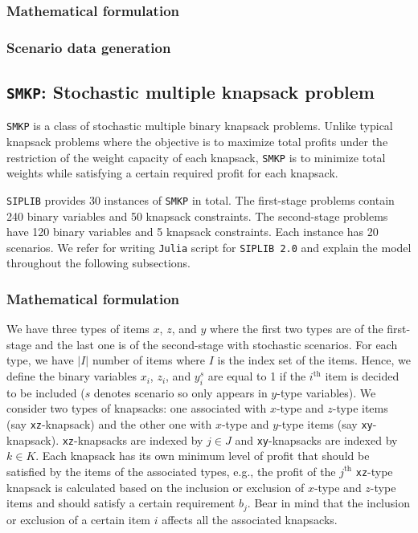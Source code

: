 \subsubsection{Mathematical formulation}

\subsubsection{Scenario data generation}


\subsection{\texttt{SMKP}: Stochastic multiple knapsack problem}
\texttt{SMKP} is a class of stochastic multiple binary knapsack problems. Unlike typical knapsack problems where the objective is to maximize total profits under the restriction of the weight capacity of each knapsack, \texttt{SMKP} is to minimize total weights while satisfying a certain required profit for each knapsack. 

\texttt{SIPLIB} provides 30 instances of \texttt{SMKP} in total. The first-stage problems contain 240 binary variables and 50 knapsack constraints. The second-stage problems have 120 binary variables and 5 knapsack constraints. Each instance has 20 scenarios. 
We refer \cite{journal:AAD2014} for writing \texttt{Julia} script for \texttt{SIPLIB 2.0} and explain the model throughout the following subsections.
\subsubsection{Mathematical formulation}
We have three types of items $x$, $z$, and $y$ where the first two types are of the first-stage and the last one is of the second-stage with stochastic scenarios. For each type, we have $|I|$ number of items where $I$ is the index set of the items. Hence, we define the binary variables $x_i$, $z_i$, and $y_i^s$ are equal to 1 if the $i^{\mathrm{th}}$ item is decided to be included ($s$ denotes scenario so only appears in $y$-type variables). We consider two types of knapsacks: one associated with $x$-type and $z$-type items (say \texttt{xz}-knapsack) and the other one with $x$-type and $y$-type items (say \texttt{xy}-knapsack). \texttt{xz}-knapsacks are indexed by $j\in J$ and \texttt{xy}-knapsacks are indexed by $k\in K$.  Each knapsack has its own minimum level of profit that should be satisfied by the items of the associated types, e.g., the profit of the $j^{\mathrm{th}}$ \texttt{xz}-type knapsack is calculated based on the inclusion or exclusion of $x$-type and $z$-type items and should satisfy a certain requirement $b_j$. Bear in mind that the inclusion or exclusion of a certain item $i$ affects all the associated knapsacks.
 
